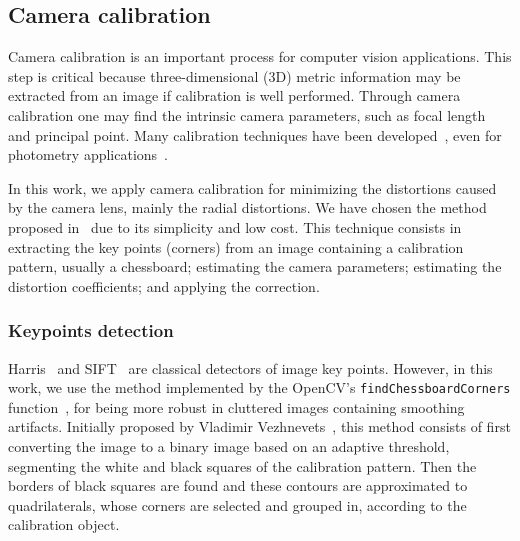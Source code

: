\subsection{Camera calibration}\label{sec:calibration}
%
Camera  calibration is an important process for computer vision applications.
This step is critical because three-dimensional (3D) metric information may be extracted from an image if calibration is well performed.
Through camera calibration one may find the intrinsic camera parameters, such as focal length and principal point.
Many calibration techniques have been developed~\cite{Geiger2012,Zhang2010a},
even for photometry applications~\cite{Yusoff2017,Perez2012}.

In this work, we apply camera calibration for minimizing the distortions caused by the camera lens, mainly the radial distortions.
We have chosen the method proposed in~\cite{Zhang2000} due to its simplicity and low cost.
This technique consists in
extracting the key points (corners) from an image containing a calibration pattern, usually a chessboard;
estimating the camera parameters;
estimating the distortion coefficients; and
applying the correction.


%
\subsubsection{Keypoints detection}
%
Harris~\cite{Harris1988} and SIFT~\cite{Lowe2004} are classical detectors of image key points.
However, in this work, we use the method implemented by the OpenCV's
\verb|findChessboardCorners| function~\cite{opencv_library},
for being more robust in cluttered images containing smoothing artifacts.
Initially proposed by Vladimir Vezhnevets~\cite{web:Vezhnevets},
this method consists of first converting the image to a binary image based on an adaptive threshold, segmenting the white and black squares of the calibration pattern.
Then the borders of black squares are found and these contours are approximated to quadrilaterals, whose corners are selected and grouped in, according to the calibration object.
%



